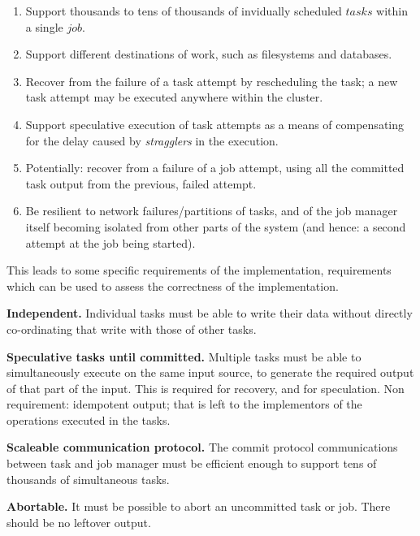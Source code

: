 \documentclass[conference]{IEEEtran}
\begin{document}
\begin{enumerate}

  \item Support thousands to tens of thousands of invidually scheduled $tasks$
  within a single $job$.

  \item Support different destinations of work, such as filesystems and databases.

  \item Recover from the failure of a task attempt by rescheduling the task;
  a new task attempt may be executed anywhere within the cluster.

  \item Support speculative execution of task attempts as a means of compensating for the
  delay caused by \emph{stragglers} in the execution.

  \item Potentially: recover from a failure of a job attempt, using all the committed
  task output from the previous, failed attempt.

  \item Be resilient to network failures/partitions of tasks, and of the job manager
  itself becoming isolated from other parts of the system (and hence: a second
  attempt at the job being started).

\end{enumerate}

This leads to some specific requirements of the implementation, requirements
which can be used to assess the correctness of the implementation.

\textbf{Independent.}
Individual tasks must be able to write their data without directly
co-ordinating that write with those of other tasks.

\textbf{Speculative tasks until committed.}
Multiple tasks must be able to simultaneously execute on the same input
source, to generate the required output of that part of the input.
This is required for recovery, and for speculation.
Non requirement: idempotent output;
that is left to the implementors of the operations executed in the tasks.

\textbf{Scaleable communication protocol.}
The commit protocol communications between task and job manager
must be efficient enough to support tens of thousands of simultaneous
tasks.

\textbf{Abortable.}
It must be possible to abort an uncommitted task or job.
There should be no leftover output.
\end{document}
